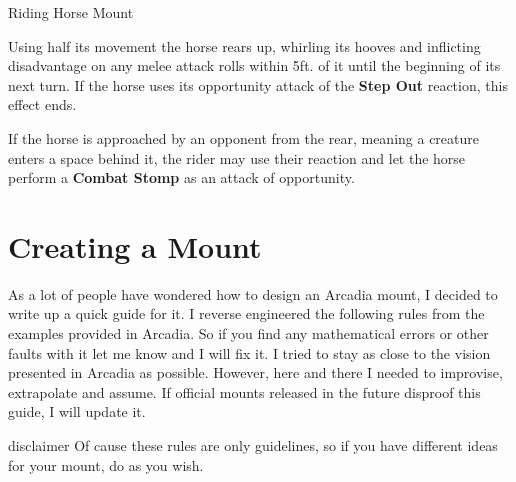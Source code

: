 \documentclass[letterpaper,twocolumn,openany,nodeprecatedcode]{dndbook}
\begin{document}
\begin{DndMonster}[float*=b,width=\textwidth + 8pt]{Riding Horse Mount}
\begin{multicols}{2}

    \DndMonsterAttack[
      name=Combat Stomp,
      distance=melee, %
      mod={+2 + PB},
      dmg=\DndDice{2d4 + 3},
      dmg-type=bludgeoning,
      extra={. If the target is a Medium or smaller creature, it must succeed on a DC 11 + PB Strength saving throw or be knocked prone.}
    ]

    Using half its movement the horse rears up, whirling its hooves and inflicting disadvantage on any melee attack rolls within 5ft. of it until the beginning of its next turn. If the horse uses its opportunity attack of the \textbf{Step Out} reaction, this effect ends.


    If the horse is approached by an opponent from the rear, meaning a creature enters a space behind it, the rider may use their reaction and let the horse perform a \textbf{Combat Stomp} as an attack of opportunity.

  \end{multicols}
\end{DndMonster}

\chapter{Creating a Mount}

As a lot of people have wondered how to design an Arcadia mount, I decided to write up a quick guide for it.
I reverse engineered the following rules from the examples provided in Arcadia.
So if you find any mathematical errors or other faults with it let me know and I will fix it.
I tried to stay as close to the vision presented in Arcadia as possible.
However, here and there I needed to improvise, extrapolate and assume.
If official mounts released in the future disproof this guide, I will update it.

\begin{DndComment}{disclaimer}
  Of cause these rules are only guidelines, so if you have different ideas for your mount, do as you wish.
\end{DndComment}
\end{document}
